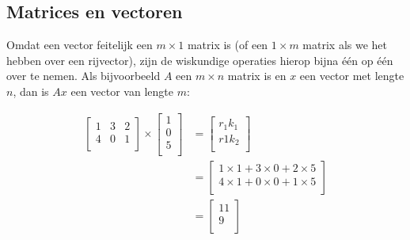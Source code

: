 \subsection{Matrices en vectoren}
Omdat een vector feitelijk een $m \times 1$ matrix is (of een $1 \times m$ matrix als we het hebben over een rijvector), zijn de wiskundige operaties hierop bijna één op één over te nemen. Als bijvoorbeeld $A$ een $m \times n$ matrix is en $x$ een vector met lengte $n$, dan is $Ax$ een vector van lengte $m$:

\[
\begin{aligned}
\begin{bmatrix}
1 & 3 & 2\\
4 & 0 & 1\\
\end{bmatrix} \times
\begin{bmatrix}
1 \\
0 \\
5 \\
\end{bmatrix} &=
\begin{bmatrix}
r_1k_1 \\
r1k_2\\
\end{bmatrix} \\
&=
\begin{bmatrix}
1 \times  1 + 3 \times 0 + 2 \times 5\\
4 \times 1 + 0 \times 0 + 1 \times 5 \\
\end{bmatrix}\\
&=
\begin{bmatrix}
11\\
9\\
\end{bmatrix}
\end{aligned}
\]

